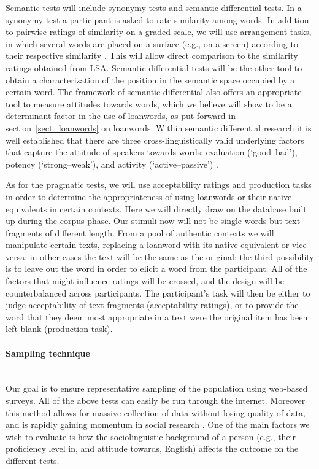 \documentclass[a4paper]{article}
\begin{document}
Semantic tests will include synonymy tests and semantic differential tests.
In a synonymy test a participant is asked to rate similarity among words.
In addition to pairwise ratings of similarity on a graded scale, we will use arrangement tasks, in which several words are placed on a surface (e.g., on a screen) according to their respective similarity \citep{Goldstone1994, Kriegeskorte2012}.
This will allow direct comparison to the similarity ratings obtained from LSA.
Semantic differential tests \citep{Osgood1957} will be the other tool to obtain a characterization of the position in the semantic space occupied by a certain word.
The framework of semantic differential also offers an appropriate tool to measure attitudes towards words, which we believe will show to be a determinant factor in the use of loanwords, as put forward in section~\ref{sect_loanwords} on loanwords.
Within semantic differential research it is well established that there are three cross-linguistically valid underlying factors that capture the attitude of speakers towards words: evaluation (`good--bad'), potency (`strong--weak'), and activity (`active--passive') \citep[see][]{Heise2010}.

As for the pragmatic tests, we will use acceptability ratings and production tasks in order to determine the appropriateness of using loanwords or their native equivalents in certain contexts.
Here we will directly draw on the database built up during the corpus phase.
Our stimuli now will not be single words but text fragments of different length.
From a pool of authentic contexts we will manipulate certain texts, replacing a loanword with its native equivalent or vice versa; in other cases the text will be the same as the original; the third possibility is to leave out the word in order to elicit a word from the participant.
All of the factors that might influence ratings will be crossed, and the design will be counterbalanced across participants.
The participant's task will then be either to judge acceptability of text fragments (acceptability ratings), or to provide the word that they deem most appropriate in a text were the original item has been left blank (production task).


\paragraph{Sampling technique}
\hspace{0pt} \\
Our goal is to ensure representative sampling of the population using web-based surveys.
All of the above tests can easily be run through the internet.
Moreover this method allows for massive collection of data without losing quality of data, and is rapidly gaining momentum in social research \citep{Denscombe2010}.
One of the main factors we wish to evaluate is how the sociolinguistic background of a person (e.g., their proficiency level in, and attitude towards, English) affects the outcome on the different tests.
\end{document}
